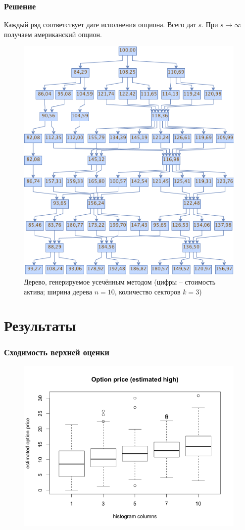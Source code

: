 \documentclass[unicode, notheorems]{beamer}
\begin{document}
  \begin{frame}
    \frametitle{Решение}
    Каждый ряд соответствует дате исполнения опциона. Всего дат $s$. При $s\to\infty$ получаем американский опцион.
      \begin{figure}[h]
        \includegraphics[height=0.5\paperheight]{linear_tree}
        \caption{Дерево, генерируемое усечённым методом (цифры -- стоимость актива; ширина дерева $n=10$, количество секторов $k=3$)}
      \end{figure} 
  \end{frame}

\section{Результаты}
  \begin{frame}
    \frametitle{Сходимость верхней оценки}
      \begin{figure}[h]
        \includegraphics[width=\linewidth, height=0.8\paperheight]{upper_estimate}
      \end{figure} 
  \end{frame}
\end{document}
